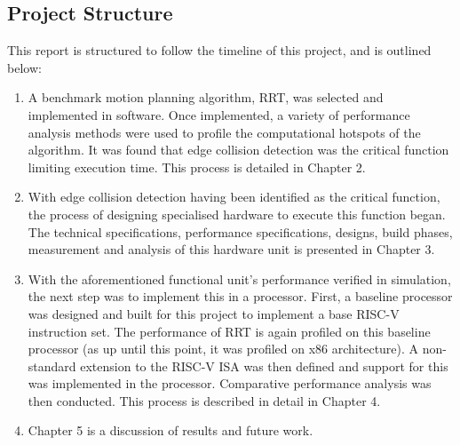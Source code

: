 
\subsection{Project Structure}
\label{subsection:project_structure}
    This report is structured to follow the timeline of this project, and is outlined below:
    \begin{enumerate}
        \item A benchmark motion planning algorithm, \gls{RRT}, was selected and implemented in software. Once implemented, a variety of performance analysis methods were used to profile the computational hotspots of the algorithm. It was found that edge collision detection was the critical function limiting execution time. This process is detailed in Chapter 2.
        \item With edge collision detection having been identified as the critical function, the process of designing specialised hardware to execute this function began. The technical specifications, performance specifications, designs, build phases, measurement and analysis of this hardware unit is presented in Chapter 3.
        \item With the aforementioned functional unit's performance verified in simulation, the next step was to implement this in a processor. First, a baseline processor was designed and built for this project to implement a base RISC-V instruction set. The performance of \gls{RRT} is again profiled on this baseline processor (as up until this point, it was profiled on x86 architecture). A non-standard extension to the RISC-V \gls{ISA} was then defined and support for this was implemented in the processor. Comparative performance analysis was then conducted. This process is described in detail in Chapter 4.
        \item Chapter 5 is a discussion of results and future work.
    \end{enumerate}

